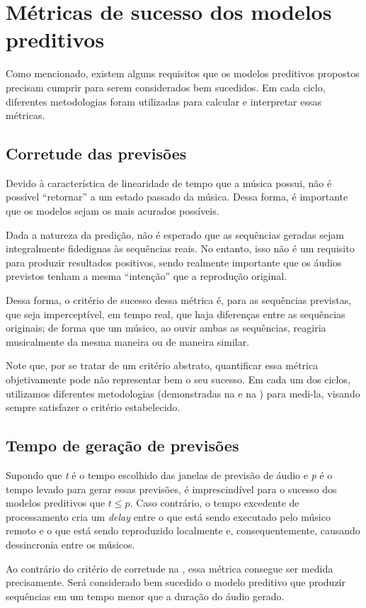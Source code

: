\section{Métricas de sucesso dos modelos preditivos}
\label{sec:success_metrics}

Como mencionado, existem alguns requisitos que os modelos preditivos propostos precisam cumprir para serem considerados bem sucedidos. Em cada ciclo, diferentes metodologias foram utilizadas para calcular e interpretar essas métricas.

\subsection{Corretude das previsões}
\label{subsec:prediction_correctness}

Devido à característica de linearidade de tempo que a música possui, não é possível ``retornar'' a um estado passado da música. Dessa forma, é importante que os modelos sejam os mais acurados possíveis.

Dada a natureza da predição, não é esperado que as sequências geradas sejam integralmente fidedignas às sequências reais. No entanto, isso não é um requisito para produzir resultados positivos, sendo realmente importante que os áudios previstos tenham a mesma ``intenção'' que a reprodução original.

Dessa forma, o critério de sucesso dessa métrica é, para as sequências previstas, que seja imperceptível, em tempo real, que haja diferenças entre as sequências originais; de forma que um músico, ao ouvir ambas as sequências, reagiria musicalmente da mesma maneira ou de maneira similar.

Note que, por se tratar de um critério abstrato, quantificar essa métrica objetivamente pode não representar bem o seu sucesso. Em cada um dos ciclos, utilizamos diferentes metodologias (demonstradas na  e na ) para medi-la, visando sempre satisfazer o critério estabelecido.

\subsection{Tempo de geração de previsões}
\label{subsec:time_metric}

Supondo que \textit{t} é o tempo escolhido das janelas de previsão de áudio e \textit{p} é o tempo levado para gerar essas previsões, é imprescindível para o sucesso dos modelos preditivos que $t \leq p $. Caso contrário, o tempo excedente de processamento cria um \textit{delay} entre o que está sendo executado pelo músico remoto e o que está sendo reproduzido localmente e, consequentemente, causando dessincronia entre os músicos.

Ao contrário do critério de corretude na , essa métrica consegue ser medida precisamente. Será considerado bem sucedido o modelo preditivo que produzir sequências em um tempo menor que a duração do áudio gerado.
